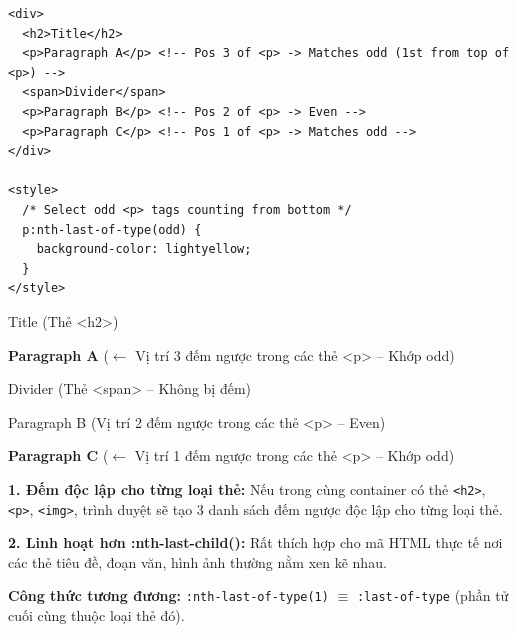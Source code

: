 \documentclass[11pt,oneside]{book}
\newcommand{\codeinline}[1]{\textcolor{accentOrange}{\texttt{#1}}}
\begin{document}
\begin{codeWindow}
\begin{lstlisting}[language=HTML5]
<div>
  <h2>Title</h2>
  <p>Paragraph A</p> <!-- Pos 3 of <p> -> Matches odd (1st from top of <p>) -->
  <span>Divider</span>
  <p>Paragraph B</p> <!-- Pos 2 of <p> -> Even -->
  <p>Paragraph C</p> <!-- Pos 1 of <p> -> Matches odd -->
</div>

<style>
  /* Select odd <p> tags counting from bottom */
  p:nth-last-of-type(odd) {
    background-color: lightyellow;
  }
</style>
\end{lstlisting}
\end{codeWindow}

\begin{browserWindow}
\sffamily\small
Title {\scriptsize\textcolor{gray!60}{(Thẻ <h2>)}} \par\vspace{2pt}
\colorbox{yellow!20}{\textbf{Paragraph A}} {\scriptsize\textcolor{gray!60}{($\leftarrow$ Vị trí 3 đếm ngược trong các thẻ <p> -- Khớp odd)}} \par\vspace{2pt}
Divider {\scriptsize\textcolor{gray!60}{(Thẻ <span> -- Không bị đếm)}} \par\vspace{2pt}
Paragraph B {\scriptsize\textcolor{gray!60}{(Vị trí 2 đếm ngược trong các thẻ <p> -- Even)}} \par\vspace{2pt}
\colorbox{yellow!20}{\textbf{Paragraph C}} {\scriptsize\textcolor{gray!60}{($\leftarrow$ Vị trí 1 đếm ngược trong các thẻ <p> -- Khớp odd)}}
\end{browserWindow}

\begin{warnBox}
\textbf{1. Đếm độc lập cho từng loại thẻ:} Nếu trong cùng container có thẻ \codeinline{<h2>}, \codeinline{<p>}, \codeinline{<img>}, trình duyệt sẽ tạo 3 danh sách đếm ngược độc lập cho từng loại thẻ.
\par\vspace{4pt}
\textbf{2. Linh hoạt hơn :nth-last-child():} Rất thích hợp cho mã HTML thực tế nơi các thẻ tiêu đề, đoạn văn, hình ảnh thường nằm xen kẽ nhau.
\end{warnBox}

\begin{tipBox}
\textbf{Công thức tương đương:} \codeinline{:nth-last-of-type(1)} $\equiv$ \codeinline{:last-of-type} (phần tử cuối cùng thuộc loại thẻ đó).
\end{tipBox}
\end{document}
